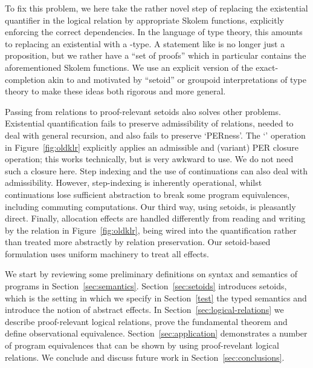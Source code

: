 \documentclass[orivec]{llncs}
\begin{document}
To fix this problem, we here
take the rather novel step of replacing the existential
quantifier in the logical relation by appropriate Skolem functions,
explicitly enforcing the correct dependencies. In the language of
type theory, this amounts to replacing an existential  with
a -type. A statement like  is no
longer just a proposition, but we rather have a ``set of
proofs''  which in particular contains
the aforementioned Skolem functions. We use an explicit version of the 
exact-completion \cite{DBLP:conf/mfps/CarboniFS87,DBLP:conf/lics/BirkedalCRS98} akin to and motivated by ``setoid'' or groupoid interpretations of type theory 
\cite{DBLP:conf/lics/HofmannS94,DBLP:journals/jfp/BartheCP03,DBLP:conf/cpp/Voevodsky11} to make these ideas both rigorous and more
general.

Passing from relations to proof-relevant setoids also solves other
problems. Existential quantification fails to preserve admissibility
of relations, needed to deal with general recursion, and also fails to
preserve `PERness'. The `' operation in
Figure~\ref{fig:oldklr} explicitly applies an admissible and (variant)
PER closure operation; this works technically, but is very awkward to
use. We do not need such a closure here. Step indexing
\cite{DBLP:conf/esop/Ahmed06,DBLP:conf/icfp/ThamsborgB11} and the use
of continuations \cite{DBLP:conf/mfcs/PittsS93} can also deal with
admissibility.  However, step-indexing is inherently operational,
whilst continuations lose sufficient abstraction to break some program
equivalences, including commuting computations. Our third way, using
setoids, is pleasantly direct. Finally, allocation
effects are handled differently from reading and writing by the
relation in Figure~\ref{fig:oldklr}, being wired into the
quantification rather than treated more abstractly by relation
preservation. Our setoid-based formulation uses uniform machinery to
treat all effects.

We start by reviewing some preliminary definitions on syntax and
semantics of programs in Section~\ref{sec:semantics}.
Section~\ref{sec:setoids} introduces setoids, which is the setting in
which we specify in Section~\ref{test} the typed semantics and
introduce the notion of abstract effects. In
Section~\ref{sec:logical-relations} we describe proof-relevant logical
relations, prove the fundamental theorem and define observational
equivalence. Section~\ref{sec:application} demonstrates a number of
program equivalences that can be shown by using proof-revelant logical
relations. We conclude and discuss future work in
Section~\ref{sec:conclusions}.
\end{document}
